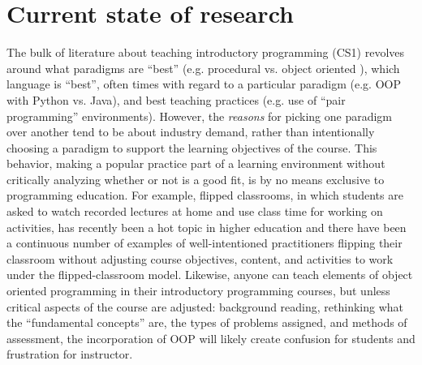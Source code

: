\documentclass[12pt]{article}
\begin{document}
\section{Current state of research}
The bulk of literature about teaching introductory programming (CS1)
revolves around what paradigms are ``best'' (e.g. procedural
vs. object oriented
\autocite{bailie_objects_2003,moritz_objectsfirst_2005,reges_back_2006}),
which language is ``best'', often times with regard to a particular
paradigm (e.g. OOP with Python
vs. Java\autocite{goldwasser_teaching_2008,koulouri_teaching_2014}),
and best teaching practices (e.g. use of “pair programming”
environments\autocite{williams_support_2001,mcdowell_effects_2002,thomas_code_2003,chong_social_2007,salleh_empirical_2011}). However,
the \emph{reasons} for picking one paradigm over another tend to be
about industry demand, rather than intentionally choosing a paradigm
to support the learning objectives of the course. This behavior,
making a popular practice part of a learning environment without
critically analyzing whether or not is a good fit, is by no means
exclusive to programming education. For example, flipped
classrooms\autocite{bishop_flipped_2013}, in which students are asked
to watch recorded lectures at home and use class time for working on
activities, has recently been a hot topic in higher education and
there have been a continuous number of examples of well-intentioned
practitioners flipping their classroom without adjusting course
objectives, content, and activities to work under the flipped-classroom
model\autocite{desantis_students_2015}. Likewise, anyone can teach
elements of object oriented programming in their introductory
programming courses, but unless critical aspects of the course are
adjusted: background reading, rethinking what the ``fundamental
concepts'' are, the types of problems assigned, and methods of
assessment, the incorporation of OOP will likely create confusion for
students and frustration for instructor\autocite{kolling_problem_1999}.

\end{document}
